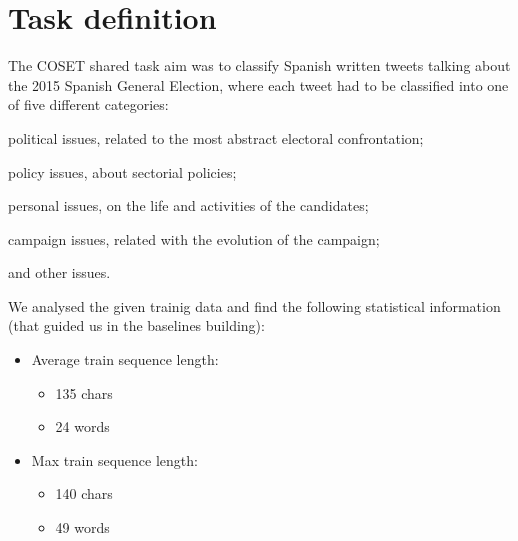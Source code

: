 \section{Task definition} \label{sec:task}

The COSET shared task aim was to classify Spanish written tweets talking about the 2015 Spanish General Election, where each tweet had to be classified into one of five different categories:
\begin{enumerate*}
\item political issues, related to the most abstract electoral confrontation; 
\item policy issues, about sectorial policies; 
\item personal issues, on the life and activities of the candidates; 
\item campaign issues, related with the evolution of the campaign;
\item and other issues.
\end{enumerate*}

We analysed the given trainig data and find the following statistical information (that guided us in the baselines building):
\begin{itemize}
\item Average train sequence length:
\begin{itemize}
\item 135 chars 
\item 24 words
\end{itemize}
\item Max train sequence length: 
\begin{itemize}
	\item 140 chars
	\item 49 words
\end{itemize}
\end{itemize}
 



